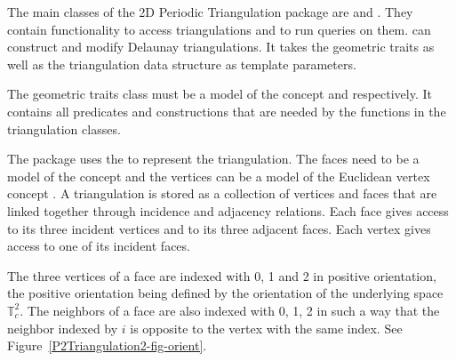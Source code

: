 


The main classes of the 2D Periodic Triangulation package are
 and
. They contain functionality
to access triangulations and to run queries on
them.  can construct and
modify Delaunay triangulations. It takes the geometric traits as well
as the triangulation data structure as template parameters. 

The geometric traits class must be a model of the concept
 and
 respectively. It
contains all predicates and constructions that are needed by the
functions in the triangulation classes.

The package uses the  to represent
the triangulation. The faces need to be a model of the concept
 and the vertices can be a
model of the Euclidean vertex concept
.  A triangulation is stored as a
collection of vertices and faces that are linked together through
incidence and adjacency relations. Each face gives access to its three
incident vertices and to its three adjacent faces. Each vertex gives
access to one of its incident faces.

The three vertices of a face are indexed with 0, 1 and 2 in positive
orientation, the positive orientation being defined by the orientation
of the underlying space $\mathbb T_c^2$. The neighbors of a face are
also indexed with 0, 1, 2 in such a way that the neighbor indexed by
$i$ is opposite to the vertex with the same index. See
Figure~\ref{P2Triangulation2-fig-orient}.


